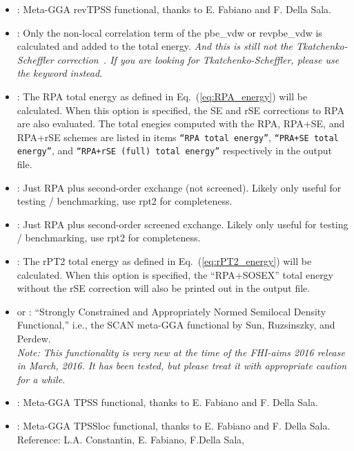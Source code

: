\begin{itemize}
{     instead.}
  \item {} : Meta-GGA revTPSS functional, thanks to E. Fabiano
    and F. Della Sala. \cite{Perdew09_revTPSS, Perdew11_revTPSS}
  \item {} : Only the non-local correlation term of the
    pbe\_vdw or revpbe\_vdw is calculated and added to the total
    energy. \emph{And this is still 
    \emph{not} the Tkatchenko-Scheffler correction~\cite{TS-vdw}. If
    you are looking for Tkatchenko-Scheffler, please use the keyword
     instead.}
  \item {} : The RPA total energy as defined in Eq.~(\ref{eq:RPA_energy}) will be calculated. 
    When this option is specified, the SE and rSE corrections to RPA are also
    evaluated. The total enegies computed with the RPA, RPA+SE, and RPA+rSE schemes 
    are listed in items \texttt{``RPA total energy''}, \texttt{``PRA+SE total energy''},
    and \texttt{``RPA+rSE (full) total energy''} respectively in the output file.
  \item {} : Just RPA plus second-order exchange (not
    screened). Likely only useful for testing / benchmarking, use rpt2
    for completeness.
  \item {} : Just RPA plus second-order screened
    exchange. Likely only useful for testing / benchmarking, use rpt2
    for completeness.
  \item {} : The rPT2 total energy as defined in
    Eq.~(\ref{eq:rPT2_energy}) will be calculated. When this option is
    specified, the ``RPA+SOSEX'' total energy without the rSE
    correction will also be printed out in the output file.
  \item {} or : ``Strongly Constrained and
    Appropriately Normed Semilocal Density Functional,'' i.e., the
    SCAN meta-GGA functional by Sun, Ruzsinszky, and Perdew.\cite{Sun2015} \\
    \emph{Note: This functionality is very new at the time of the
      FHI-aims 2016 release in March, 2016. It has been tested, but
      please treat it with appropriate caution for a while.}
  \item {} : Meta-GGA TPSS functional, thanks to E. Fabiano
    and F. Della Sala. \cite{Tao03_TPSS}
  \item {} : Meta-GGA TPSSloc functional, thanks to E. Fabiano
    and F. Della Sala. Reference: L.A. Constantin, E. Fabiano, F.Della Sala,

\end{itemize}
